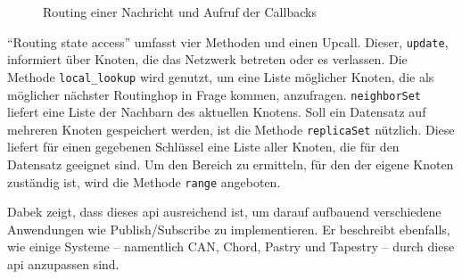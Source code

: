 \begin{figure}[htbp]
\centering
{}
\caption{Routing einer Nachricht und Aufruf der Callbacks}
\label{fig:routing_kbr}
\end{figure}


\enquote{Routing state access} umfasst vier Methoden und einen Upcall. Dieser, \texttt{update}, informiert über Knoten, die das Netzwerk betreten oder es verlassen. Die Methode \texttt{local\_lookup} wird genutzt, um eine Liste möglicher Knoten, die als möglicher nächster Routinghop in Frage kommen, anzufragen. \texttt{neighborSet} liefert eine Liste der Nachbarn des aktuellen Knotens. Soll ein Datensatz auf mehreren Knoten gespeichert werden, ist die Methode \texttt{replicaSet} nützlich. Diese liefert für einen gegebenen Schlüssel eine Liste aller Knoten, die für den Datensatz geeignet sind. Um den Bereich zu ermitteln, für den der eigene Knoten zuständig ist, wird die Methode \texttt{range} angeboten.

Dabek zeigt, dass dieses \acf{api} ausreichend ist, um darauf aufbauend verschiedene Anwendungen wie Publish/Subscribe zu implementieren. Er beschreibt ebenfalls, wie einige Systeme -- namentlich CAN, Chord, Pastry und Tapestry -- durch diese \ac{api} anzupassen sind.
